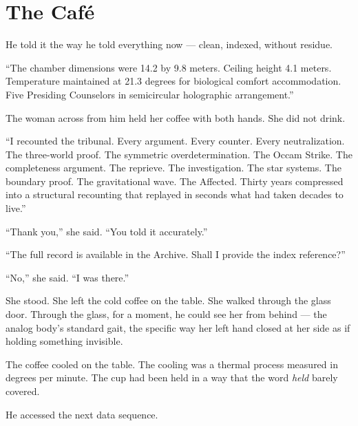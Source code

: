 \chapter*{The Café}

\noindent He told it the way he told everything now — clean, indexed, without residue.

\enquote{The chamber dimensions were 14.2 by 9.8 meters. Ceiling height 4.1 meters. Temperature maintained at 21.3 degrees for biological comfort accommodation. Five Presiding Counselors in semicircular holographic arrangement.}

The woman across from him held her coffee with both hands. She did not drink.

\enquote{I recounted the tribunal. Every argument. Every counter. Every neutralization. The three-world proof. The symmetric overdetermination. The Occam Strike. The completeness argument. The reprieve. The investigation. The star systems. The boundary proof. The gravitational wave. The Affected. Thirty years compressed into a structural recounting that replayed in seconds what had taken decades to live.}

\enquote{Thank you,} she said. \enquote{You told it accurately.}

\enquote{The full record is available in the Archive. Shall I provide the index reference?}

\enquote{No,} she said. \enquote{I was there.}

She stood. She left the cold coffee on the table. She walked through the glass door. Through the glass, for a moment, he could see her from behind — the analog body's standard gait, the specific way her left hand closed at her side as if holding something invisible.

The coffee cooled on the table. The cooling was a thermal process measured in degrees per minute. The cup had been held in a way that the word \emph{held} barely covered.

He accessed the next data sequence.

\clearpage